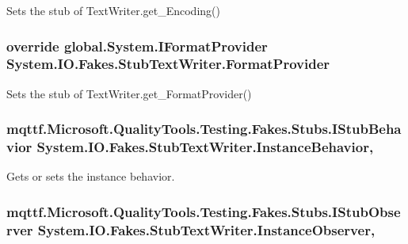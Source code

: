 Sets the stub of Text\-Writer.\-get\-\_\-\-Encoding()

\hypertarget{class_system_1_1_i_o_1_1_fakes_1_1_stub_text_writer_ac3b061327b2956dacbd966f243a64f14}{
\subsubsection[{Format\-Provider}]{\setlength{\rightskip}{0pt plus 5cm}override global.\-System.\-I\-Format\-Provider System.\-I\-O.\-Fakes.\-Stub\-Text\-Writer.\-Format\-Provider\hspace{0.3cm}{\ttfamily [get]}}}\label{class_system_1_1_i_o_1_1_fakes_1_1_stub_text_writer_ac3b061327b2956dacbd966f243a64f14}


Sets the stub of Text\-Writer.\-get\-\_\-\-Format\-Provider()

\hypertarget{class_system_1_1_i_o_1_1_fakes_1_1_stub_text_writer_a6fc84b2e4c6a90bb095539c03c77ffc1}{
\subsubsection[{Instance\-Behavior}]{\setlength{\rightskip}{0pt plus 5cm}mqttf.\-Microsoft.\-Quality\-Tools.\-Testing.\-Fakes.\-Stubs.\-I\-Stub\-Behavior System.\-I\-O.\-Fakes.\-Stub\-Text\-Writer.\-Instance\-Behavior\hspace{0.3cm}{\ttfamily [get]}, {\ttfamily [set]}}}\label{class_system_1_1_i_o_1_1_fakes_1_1_stub_text_writer_a6fc84b2e4c6a90bb095539c03c77ffc1}


Gets or sets the instance behavior.

\hypertarget{class_system_1_1_i_o_1_1_fakes_1_1_stub_text_writer_ae3d154a11af3ea7248cf70b9f5f8e699}{
\subsubsection[{Instance\-Observer}]{\setlength{\rightskip}{0pt plus 5cm}mqttf.\-Microsoft.\-Quality\-Tools.\-Testing.\-Fakes.\-Stubs.\-I\-Stub\-Observer System.\-I\-O.\-Fakes.\-Stub\-Text\-Writer.\-Instance\-Observer\hspace{0.3cm}{\ttfamily [get]}, {\ttfamily [set]}}}\label{class_system_1_1_i_o_1_1_fakes_1_1_stub_text_writer_ae3d154a11af3ea7248cf70b9f5f8e699}


